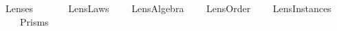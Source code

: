 %
\begin{isabellebody}%
%
%
\isadelimtheory
%
\endisadelimtheory
%
\isatagtheory
{}\isamarkupfalse%
\ Lenses\isanewline
\ \ \isanewline
\ \ \ \ Lens{\isacharunderscore}Laws\isanewline
\ \ \ \ Lens{\isacharunderscore}Algebra\isanewline
\ \ \ \ Lens{\isacharunderscore}Order\isanewline
\ \ \ \ Lens{\isacharunderscore}Instances\isanewline
\ \ \ \ Prisms\isanewline
{}\ \isamarkupfalse%
%
\endisatagtheory
{\isafoldtheory}%
%
\isadelimtheory
%
\endisadelimtheory
%
\end{isabellebody}%

